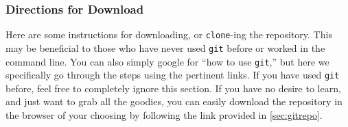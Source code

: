 \documentclass[12pt]{article}
\begin{document}
\subsubsection{Directions for Download} \label{sec:downloadrepo}

Here are some instructions for downloading, or \texttt{clone}-ing the repository. This may be beneficial to those who have never used \texttt{git} before or worked in the command line. You can also simply google for ``how to use \texttt{git},'' but here we specifically go through the steps using the pertinent links. If you have used \texttt{git} before, feel free to completely ignore this section. If you have no desire to learn, and just want to grab all the goodies, you can easily download the repository in the browser of your choosing by following the link provided in \ref{sec:gitrepo}.
\end{document}
